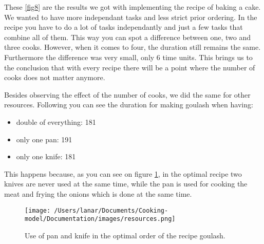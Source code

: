 These \ref{fig8} are the results we got with implementing the recipe of baking a cake. We wanted to have more independant tasks and less strict prior ordering. 
In the recipe you have to do a lot of tasks independantly and just a few tasks that combine all of them. This way you can spot a difference 
between one, two and three cooks. However, when it comes to four, the duration still remains the same. Furthermore the difference was very small, only 6 time units. This brings us to the conclusion that with every recipe 
there will be a point where the number of cooks does not matter anymore. 


Besides observing the effect of the number of cooks, we did the same for other resources. Following you can see the duration for making goulash when having:
\begin{itemize}
    \item double of everything: 181
    \item only one pan: 191
    \item only one knife: 181
\end{itemize}

This happens because, as you can see on figure \ref{fig9}, in the optimal recipe two knives are never used at the same time, while the pan is used for cooking the meat and frying the onions which is done at the same time. 

\begin{figure}[H]
    \centerline{\texttt{[image: /Users/lanar/Documents/Cooking-model/Documentation/images/resources.png]}}
    \caption{Use of pan and knife in the optimal order of the recipe goulash.}
    \label{fig9}
\end{figure}

